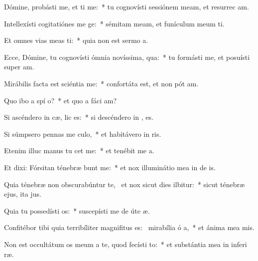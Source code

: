 \item Dómine, probásti me, et ti me:~* tu cognovísti sessiónem meam, et resurrec am.
\item Intellexísti cogitatiónes me  ge:~* sémitam meam, et funículum meum ti.
\item Et omnes vias meas ti:~* quia non est sermo   a.
\item Ecce, Dómine, tu cognovísti ómnia novíssima,  qua:~* tu formásti me, et posuísti super   am.
\item Mirábilis facta est sciéntia   me:~* confortáta est, et non pót  am.
\item Quo ibo a spí o?~* et quo a fáci  am?
\item Si ascéndero in cæ,  lic es:~* si descéndero in , es.
\item Si súmpsero pennas me culo,~* et habitávero in  ris.
\item Etenim illuc manus tu cet me:~* et tenébit me  a.
\item Et dixi: Fórsitan ténebræ bunt me:~* et nox illuminátio mea in de is.
\item Quia ténebræ non obscurabúntur  te,~\pscross{} et nox sicut dies ilbitur:~* sicut ténebræ ejus, ita   jus.
\item Quia tu possedísti  os:~* suscepísti me de úte  æ.
\item Confitébor tibi quia terribíliter magnifitus es:~\pscross{} mirabília ó a,~* et ánima mea  mis.
\item Non est occultátum os meum a te, quod fecísti  to:~* et substántia mea in inferi ræ.
